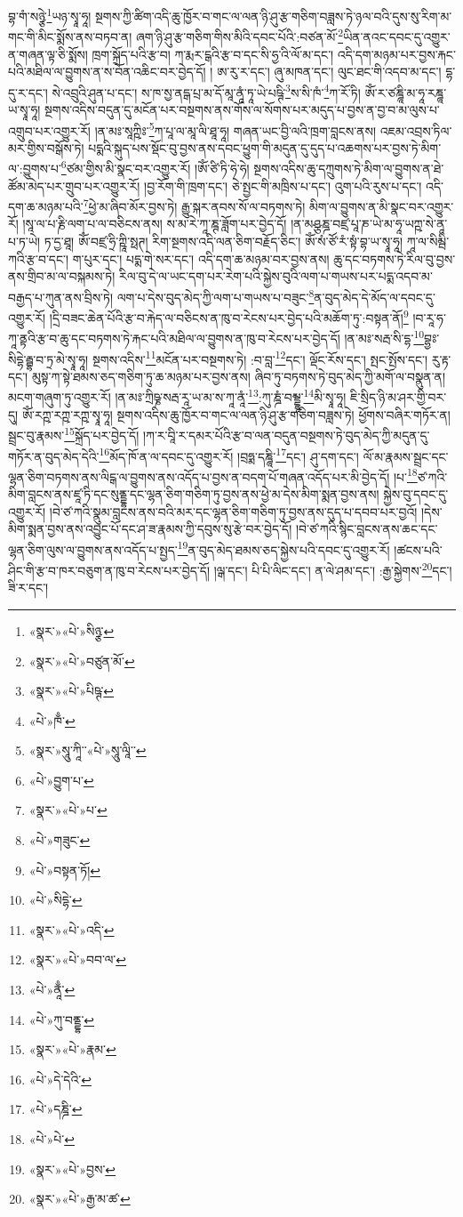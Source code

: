 བྷ་གཾ་སཉྩེ་\footnote{«སྣར་»«པེ་»སིཉྩ་}ཡཉ་སྭཱ་ཧཱ། སྔགས་ཀྱི་ཚིག་འདི་ཆུ་ཁྱོར་བ་གང་ལ་ལན་ཉི་ཤུ་རྩ་གཅིག་བཟླས་ཏེ་ཉལ་བའི་དུས་སུ་རིག་མ་གང་གི་མིང་སྨོས་ནས་བཏབ་ན། ཞག་ཉི་ཤུ་རྩ་གཅིག་གིས་མིའི་དབང་པོའི་:བཙན་མོ་\footnote{«སྣར་»«པེ་»བཙུན་མོ་}ཡིན་ནའང་དབང་དུ་འགྱུར་ན་གཞན་ལྟ་ཅི་སྨོས། ཁྲག་སྐྲོད་པའི་རྩ་བ། ཀ་རྨར་ངྒའི་རྩ་བ་དང་སི་ཧྱ་འི་ལོ་མ་དང་། འདི་དག་མཉམ་པར་བྱས་རྐང་པའི་མཐིལ་ལ་བྱུགས་ན་ས་བོན་འཆིང་བར་བྱེད་དོ། །
ཨ་རུ་ར་དང་། ཞུ་མཁན་དང་། ལུང་ཐང་གི་འདབ་མ་དང་། དྷ་དུ་ར་དང་། སེ་འབྲུའི་ཤུན་པ་དང་། ས་ཁ་སྱ་ནདྒ་པྲ་མ་དོ་མཱ་ནཱཾ་ཏཱ་ཡེ་པཥྚི་\footnote{«སྣར་»«པེ་»པིཥྚ་}ས་སི་ཁཾ་\footnote{«པེ་»ཁྃ་}ཀ་རོ་ཏི། ཨོཾ་ར་ཙཎྜཱི་མ་ཧཱ་རཎྜཱ་ཡ་སྭཱ་ཧཱ། སྔགས་འདིས་བདུན་དུ་མངོན་པར་བསྔགས་ནས་གོས་ལ་སོགས་པར་མདུད་པ་བྱས་ན་བྱ་བ་མ་ལུས་པ་འགྲུབ་པར་འགྱུར་རོ། །ན་མཿ་སཱཀྵིཿ་\footnote{«སྣར་»སཱུ་ཀཱི་་«པེ་»སཱུ་ལཱི་་}ཀ་པཱ་ལ་མཱ་ལི་ཐཱ་ཧཱ། གཞན་ཡང་བྱི་ལའི་ཁྲག་བླངས་ནས། འཇམ་འབྲས་ཏིལ་མར་གྱིས་བསྒོས་ཏེ། པདྨའི་སྐུད་པས་སྡོང་བུ་བྱས་ནས་དབང་ཕྱུག་གི་མདུན་དུ་དུད་པ་འཆགས་པར་བྱས་ཏེ་མིག་ལ་:བྱུགས་པ་\footnote{«པེ་»བྱུག་པ་}ཙམ་གྱིས་མི་སྣང་བར་འགྱུར་རོ། །ཨོཾ་ཙི་ཏི་ཧེ་ཧེ། སྔགས་འདིས་ཆུ་དཀྲུགས་ཏེ་མིག་ལ་བྱུགས་ན་ཐེ་ཚོམ་མེད་པར་གྲུབ་པར་འགྱུར་རོ། །བྱ་རོག་གི་ཁྲག་དང་། ཅེ་སྤྱང་གི་མཁྲིས་པ་དང་། འུག་པའི་རུས་པ་དང་། འདི་དག་ཆ་མཉམ་པའི་\footnote{«སྣར་»«པེ་»པ་}ཕྱེ་མ་ཞིབ་མོར་བྱས་ཏེ། རྒྱུ་སྐར་ནབས་སོ་ལ་བཏགས་ཏེ། མིག་ལ་བྱུགས་ན་མི་སྣང་བར་འགྱུར་རོ། །སཱ་ལ་པ་རྞི་ལག་པ་ལ་བཅིངས་ནས། ས་མ་རེ་ཀཱ་ཎྚ་ཟློག་པར་བྱེད་དོ། །ན་མཤྩཎྜ་བཛྲ་པཱ་ཎ་ཡེ་མ་ཧཱ་ཡཀྵ་སེ་ནཱ་པ་ཏ་ཡེ། ཏ་དྱ་ཐཱ། ཨོཾ་བཛྲ་ཧྲི་ཀྵཱི་སྥཊ། རིག་སྔགས་འདི་ལན་ཅིག་བརྗོད་ཅིང་། ཨོཾ་སཾ་ཙོ་རཾ་སྟཾ་བྷ་ཡ་སྭཱ་ཧཱ། ཀཱ་ལ་སིམྦི་ཀའི་རྩ་བ་དང་། ག་པུར་དང་། པདྨ་གེ་སར་དང་། འདི་དག་ཆ་མཉམ་བར་བྱས་ནས། ཆུ་དང་བཏགས་ཏེ་རིལ་བུ་བྱས་ནས་གྲིབ་མ་ལ་བསྐམས་ཏེ། རིལ་བུ་དེ་ལ་ཡང་དག་པར་རེག་པའི་སྐྱེས་བུའི་ལག་པ་གཡས་པར་པདྨ་འདབ་མ་བརྒྱད་པ་ཀུན་ནས་བྲིས་ཏེ། ལག་པ་དེས་བུད་མེད་ཀྱི་ལག་པ་གཡས་པ་བཟུང་\footnote{«པེ་»གཟུང་}ན་བུད་མེད་དེ་མོད་ལ་དབང་དུ་འགྱུར་རོ། །དྲི་བཟང་ཆེན་པོའི་རྩ་བ་རྐེད་ལ་བཅིངས་ན་ཁུ་བ་རེངས་པར་བྱེད་པའི་མཆོག་ཏུ་:བསྟན་ནོ།\footnote{«པེ་»བསྟན་ཏོ།} །བ་རཱ་ཧ་ཀཱ་ནྟའི་རྩ་བ་ཆུ་དང་བཏགས་ཏེ་རྐང་པའི་མཐིལ་ལ་བྱུགས་ན་ཁུ་བ་རེངས་པར་བྱེད་དོ། །ན་མཿ་སརྦ་སི་དྷ་\footnote{«པེ་»སིདྷེ་}བྷྱཿ་སིདྷེ་རྦྷ་བ་ཏྲ་མེ་སྭཱ་ཧཱ། སྔགས་འདིས་\footnote{«སྣར་»«པེ་»འདི་}མངོན་པར་བསྔགས་ཏེ། :བ་བླ་\footnote{«སྣར་»«པེ་»བབ་ལ་}དང་། ལྡོང་རོས་དང་། སྤང་སྤོས་དང་། རུ་རྟ་དང་། མུསྟ་ཀ་སྟེ་ཐམས་ཅད་གཅིག་ཏུ་ཆ་མཉམ་པར་བྱས་ནས། ཞིབ་ཏུ་བཏགས་ཏེ་བུད་མེད་ཀྱི་མགོ་ལ་བསྣུན་ན། མངག་གཞུག་ཏུ་འགྱུར་རོ། །ན་མཿ་ཀྲིཥྞ་སརྦ་རཱ་ཡ་མ་ས་ཀཱ་ནཱཾ་\footnote{«པེ་»ནཱྃ་}:ཀུ་ཎྜཾ་བམྡྷཱ་\footnote{«པེ་»ཀུ་བནྡྷ་}མི་སྭཱ་ཧཱ། ཇི་སྲིད་ཉི་མ་ཤར་གྱི་བར་དུ། ཨོཾ་རཀྵ་རཀྵ་རཀྵ་སྭཱ་ཧཱ། སྔགས་འདིས་ཆུ་ཁྱོར་བ་གང་ལ་ལན་ཉི་ཤུ་རྩ་གཅིག་བཟླས་ཏེ། ཕྱོགས་བཞིར་གཏོར་ན། སྦྲང་བུ་རྣམས་\footnote{«སྣར་»«པེ་»རྣམ་}སྐྲོད་པར་བྱེད་དོ། །ཀ་ར་བཱི་ར་དམར་པོའི་རྩ་བ་ལན་བདུན་བསྔགས་ཏེ་བུད་མེད་ཀྱི་མདུན་དུ་གཏོར་ན་བུད་མེད་དེའི་\footnote{«པེ་»དེ་དེའི་}མོད་ཁོ་ན་ལ་དབང་དུ་འགྱུར་རོ། །བྲཧྨ་དཎྜཱི་\footnote{«པེ་»དཎྜི་}དང་། ཤུ་དག་དང་། ལོ་མ་རྣམས་སྦྲང་དང་ལྷན་ཅིག་བཏགས་ནས་ལིངྒ་ལ་བྱུགས་ནས་འདོད་པ་བྱས་ན་བདག་པོ་གཞན་འདོད་པར་མི་བྱེད་དོ། །པ་\footnote{«པེ་»པེ་}ཙ་ཀའི་མིག་བླངས་ནས་ཛཱ་ཏི་དང་སུནྡྷ་དང་ལྷན་ཅིག་གཅིག་ཏུ་བྱས་ནས་ཕྱེ་མ་དེས་མིག་སྨན་བྱས་ནས། སྐྱེས་བུ་དབང་དུ་འགྱུར་རོ། །བེ་ཙ་ཀའི་སྣུམ་བླངས་ནས་བའི་མར་དང་ལྷན་ཅིག་གཅིག་ཏུ་བྱས་ནས་དུད་པ་དབབ་པར་བྱའོ། །དེས་མིག་སྨན་བྱས་ནས་འབྱུང་པོ་དང་ཤ་ཟ་རྣམས་ཀྱི་དབུས་སུ་རྩེ་བར་བྱེད་དོ། །བེ་ཙ་ཀའི་སྙིང་བླངས་ནས་ཆང་དང་ལྷན་ཅིག་ལུས་ལ་བྱུགས་ནས་འདོད་པ་སྤྱད་\footnote{«སྣར་»«པེ་»བྱས་}ན་བུད་མེད་ཐམས་ཅད་སྐྱེས་པའི་དབང་དུ་འགྱུར་རོ། །ཚངས་པའི་ཤིང་གི་རྩ་བ་ཁར་བཅུག་ན་ཁུ་བ་རེངས་པར་བྱེད་དོ། །ལྒ་དང་། པི་པི་ལིང་དང་། ན་ལེ་ཤམ་དང་། :རྒྱ་སྐྱེགས་\footnote{«སྣར་»«པེ་»རྒྱ་མ་ཚ་}དང་། ཟི་ར་དང་། 